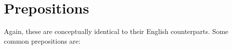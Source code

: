 \section{Prepositions}

Again, these are conceptually identical to their English counterparts. Some common prepositions are:

\begin{itemize}
\end{itemize}
